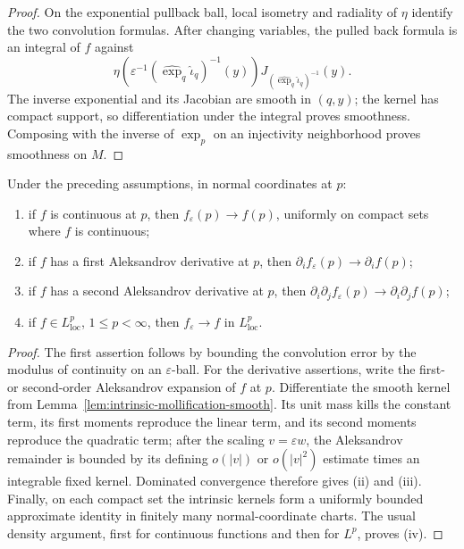 \begin{proof}
\sketch
{}
On the exponential pullback ball, local isometry and radiality of $\eta$
identify the two convolution formulas.  After changing variables, the pulled
back formula is an integral of $f$ against
\[
\eta\!\left(\varepsilon^{-1}(\widehat{\exp}_q\widehat{\iota}_q)^{-1}(y)\right)
 J_{(\widehat{\exp}_q\widehat{\iota}_q)^{-1}}(y).
\]
The inverse exponential and its Jacobian are smooth in $(q,y)$; the kernel
has compact support, so differentiation under the integral proves smoothness.
Composing with the inverse of $\exp_p$ on an injectivity neighborhood proves
smoothness on $M$.
\end{proof}

\begin{lemma}
\label{lem:intrinsic-mollifier-derivative-convergence}

Under the preceding assumptions, in normal coordinates at $p$:
\begin{enumerate}
\item if $f$ is continuous at $p$, then $f_\varepsilon(p)\to f(p)$, uniformly
on compact sets where $f$ is continuous;
\item if $f$ has a first Aleksandrov derivative at $p$, then
$\partial_if_\varepsilon(p)\to\partial_if(p)$;
\item if $f$ has a second Aleksandrov derivative at $p$, then
$\partial_i\partial_jf_\varepsilon(p)\to\partial_i\partial_jf(p)$;
\item if $f\in L^p_{\mathrm{loc}}$, $1\leq p<\infty$, then
$f_\varepsilon\to f$ in $L^p_{\mathrm{loc}}$.
\end{enumerate}
\end{lemma}

\begin{proof}
\sketch
{}
The first assertion follows by bounding the convolution error by the modulus
of continuity on an $\varepsilon$-ball.  For the derivative assertions, write
the first- or second-order Aleksandrov expansion of $f$ at $p$.  Differentiate
the smooth kernel from Lemma~\ref{lem:intrinsic-mollification-smooth}.  Its
unit mass kills the constant term, its first moments reproduce the linear
term, and its second moments reproduce the quadratic term; after the scaling
$v=\varepsilon w$, the Aleksandrov remainder is bounded by its defining
$o(|v|)$ or $o(|v|^2)$ estimate times an integrable fixed kernel.  Dominated
convergence therefore gives (ii) and (iii).  Finally, on each compact set the
intrinsic kernels form a uniformly bounded approximate identity in finitely
many normal-coordinate charts.  The usual density argument, first for
continuous functions and then for $L^p$, proves (iv).
\end{proof}

